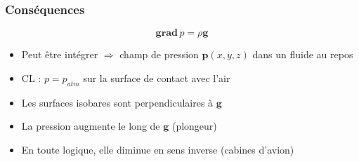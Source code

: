 \documentclass[%
	final, %
	 10pt, %
 	compress, %
hyperref={bookmarks=true}	
]{beamer}
\renewcommand{\v}[1]{\ensuremath{\bm{#1}}} %
\newcommand{\ddr}[1]{\, \mathrm{d} #1}
\newcommand{\grad}[1]{\bm{grad} \, {#1}}
\begin{document}
\begin{frame}\frametitle{Conséquences}
\begin{dmath*}
\grad{p} = \rho \v{g}
\end{dmath*}
\begin{itemize}
\item Peut être intégrer $\Rightarrow$ champ de pression
  $\v{p}(x,y,z)$ dans un fluide au repos
\item CL : $p = p_{atm}$ sur la surface de contact avec l'air
\item Les surfaces isobares sont perpendiculaires à $\v{g}$ 
\item La pression augmente le long de $\v{g}$ (plongeur)
\item En toute logique, elle diminue en sens inverse (cabines d'avion)
\end{itemize}
\end{frame}




\end{document}
